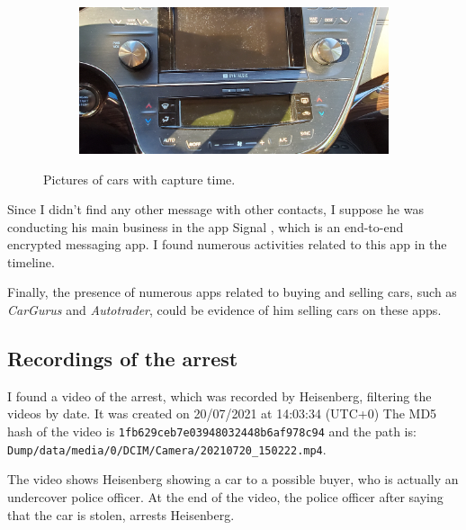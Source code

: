 \documentclass[12pt]{article}
\begin{document}
\begin{figure}[!ht]
    \hspace{2 pt}
    \begin{subfigure}[b]{0.4\textwidth}
        \centering
        \includegraphics[width=\textwidth]{images/car_photos/20210703_192907.jpg} %
        \caption{}
    \end{subfigure}
    \caption{Pictures of cars with capture time.}
    \label{fig:cars2}
\end{figure}

Since I didn't find any other message with other contacts, I suppose he was conducting his main business in the app Signal \cite{signal}, which is an end-to-end encrypted messaging app. I found numerous activities related to this app in the timeline.

Finally, the presence of numerous apps related to buying and selling cars, such as \textit{CarGurus} and \textit{Autotrader}, could be evidence of him selling cars on these apps.

\subsection{Recordings of the arrest}

I found a video of the arrest, which was recorded by Heisenberg, filtering the videos by date.
It was created on 20/07/2021 at 14:03:34 (UTC+0)
The MD5 hash of the video is \texttt{1fb629ceb7e03948032448b6af978c94} and the path is:\\
\texttt{Dump/data/media/0/DCIM/Camera/20210720\_150222.mp4}.

The video shows Heisenberg showing a car to a possible buyer, who is actually an undercover police officer. At the end of the video, the police officer after saying that the car is stolen, arrests Heisenberg.
\end{document}
